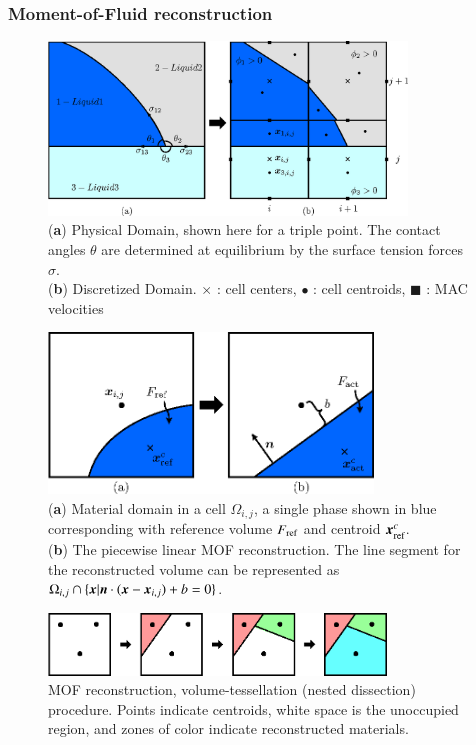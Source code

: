 \documentclass[preprint,12pt]{Definitions/elsarticle}
\newcommand{\tn}{\textnormal}
\newcommand{\bmx}{\mbox{\boldmath $x$\unboldmath}}
\newcommand{\bmn}{\mbox{\boldmath $n$\unboldmath}}
\begin{document}
\subsubsection{Moment-of-Fluid reconstruction}
\begin{figure}[H]
	\centering
	\includegraphics[width=0.85\textwidth]{triple_point_drop_impact.eps}
	\caption{(\textbf{a}) Physical Domain, shown here for a triple point. The contact angles $\theta$ are determined at equilibrium by the surface tension forces $\sigma$.  \\
		(\textbf{b}) Discretized Domain. $\times$ : cell centers, $\bullet$ : cell centroids, $\scriptstyle \blacksquare$ : MAC velocities}
	\label{fig:triple_point}
\end{figure}   
\unskip
\begin{figure}[H]
	\centering
	\includegraphics[width=0.77\textwidth]{mof_reconstruction.eps}
	\caption{(\textbf{a}) Material domain in a cell $\Omega_{i,j}$, a single phase shown in blue corresponding with reference volume $F_\tn{ref}$ and centroid $\bmx_\tn{ref}^c$.  \\
		(\textbf{b}) The piecewise linear MOF reconstruction. The line segment for the reconstructed volume can be represented as $\Omega_{i,j}\cap\{\bmx|\bmn\cdot(\bmx-\bmx_{i,j})+b=0\}$. }
	\label{fig:mof_reconstruction}
\end{figure}   
\unskip
\begin{figure}[H]
	\centering
	\includegraphics[width=0.8\textwidth]{mof_tes.eps}
	\caption{MOF reconstruction, volume-tessellation (nested dissection) procedure. Points indicate centroids, white space is the unoccupied region, and zones of color indicate reconstructed materials.}
	\label{fig:mof_tess}
\end{figure}   
\end{document}
